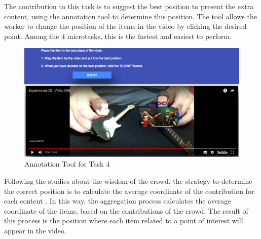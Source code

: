 
The contribution to this task is to suggest the best position to present the extra content, using the annotation tool to determine this position. The tool allows the worker to change the position of the items in the video by clicking the desired point. Among the 4 microtasks, this is the fastest and easiest to perform.




\begin{figure}[h!]
	\centerline{\includegraphics[scale=0.20] {figure/task_4_new}}
	\caption{Annotation Tool for Task 4}
	\label{task_4}
\end{figure}


Following the studies about the wisdom of the crowd, the strategy to determine the correct position is to calculate the average coordinate of the contribution for each content \citep{GALTON1907}. In this way, the aggregation process calculates the average coordinate of the items, based on the contributions of the crowd. The result of this process is the position where each item related to a point of interest will appear in the video.



